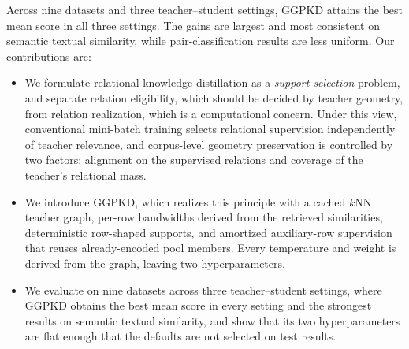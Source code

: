 Across nine datasets and three teacher--student settings, GGPKD attains the
best mean score in all three settings. The gains are largest and most
consistent on semantic textual similarity, while pair-classification results
are less uniform. Our contributions are:
\begin{itemize}
    \item We formulate relational knowledge distillation as a
    \emph{support-selection} problem, and separate relation eligibility, which
    should be decided by teacher geometry, from relation realization, which is
    a computational concern. Under this view, conventional mini-batch training
    selects relational supervision independently of teacher relevance, and
    corpus-level geometry preservation is controlled by two factors: alignment
    on the supervised relations and coverage of the teacher's relational mass.

    \item We introduce \textsc{GGPKD}, which realizes this principle with a
    cached $k$NN teacher graph, per-row bandwidths derived from the
    retrieved similarities, deterministic row-shaped supports, and amortized
    auxiliary-row supervision that reuses already-encoded pool members. Every
    temperature and weight is derived from the graph, leaving two
    hyperparameters.

    \item We evaluate on nine datasets across three teacher--student settings,
    where GGPKD obtains the best mean score in every setting and the strongest
    results on semantic textual similarity, and show that its two
    hyperparameters are flat enough that the defaults are not selected on test
    results.
\end{itemize}
